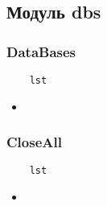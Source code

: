 \subsection{Модуль dbs}

\subsubsection{DataBases}

\begin{lstlisting}
    lst
\end{lstlisting}

\begin{itemize}
    \item \verb||
\end{itemize}

\subsubsection{CloseAll}

\begin{lstlisting}
    lst
\end{lstlisting}

\begin{itemize}
    \item \verb||
\end{itemize}

